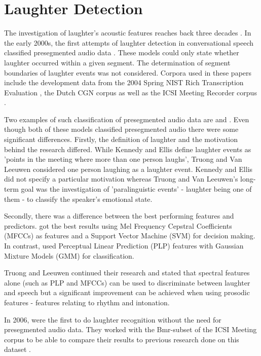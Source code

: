 \documentclass[bsc,frontabs,parskip,deptreport]{infthesis}
\begin{document}
\section{Laughter Detection} \label{sec:bg-laughter}
The investigation of laughter's acoustic features reaches back three decades \citep{bickley1992acoustic}.
In the early 2000s, the first attempts of laughter detection in conversational speech classified presegmented audio data \citep{kennedy2004laughter, truong2005automatic}. These models could only state whether laughter occurred within a given segment. The determination of segment boundaries of laughter events was not considered. 
Corpora used in these papers include the development data from the 2004 Spring NIST Rich Transcription Evaluation \citep{ldcnistcorpus}, the Dutch CGN corpus \citep{oostdijk2000spoken} as well as the ICSI Meeting Recorder corpus \citep{morgan2001meeting}. 

Two examples of such classification of presegmented audio data are \citet{kennedy2004laughter} and \citet{truong2005automatic}. 
Even though both of these models classified presegmented audio there were some significant differences. 
Firstly, the definition of laughter and the motivation behind the research differed.
While Kennedy and Ellis define laughter events as 'points in the meeting where more than one person laughs', Truong and Van Leeuwen considered one person laughing as a laughter event.
Kennedy and Ellis did not specify a particular motivation whereas Truong and Van Leeuwen's long-term goal was the investigation of 'paralinguistic events' - laughter being one of them - to classify the speaker's emotional state.   

Secondly, there was a difference between the best performing features and predictors.  
\citet{kennedy2004laughter} got the best results using Mel Frequency Cepstral Coefficients (MFCCs) as features and a Support Vector Machine (SVM) for decision making. 
In contrast, \citet{truong2005automatic} used Perceptual Linear Prediction (PLP) features with Gaussian Mixture Models (GMM) for classification. 

Truong and Leeuwen continued their research \citep{truong2007automatic} and stated that spectral features alone (such as PLP and MFCCs) can be used to discriminate between laughter and speech but a significant improvement can be achieved when using prosodic features - features relating to rhythm and intonation.

In 2006, \citet{knox2006automatic} were the first to do laughter recognition without the need for presegmented audio data.  
They worked with the Bmr-subset of the ICSI Meeting corpus \citep{morgan2001meeting} to be able to compare their results to previous research done on this dataset \citep{kennedy2004laughter, truong2005automatic, truong2007automatic}.
\end{document}
